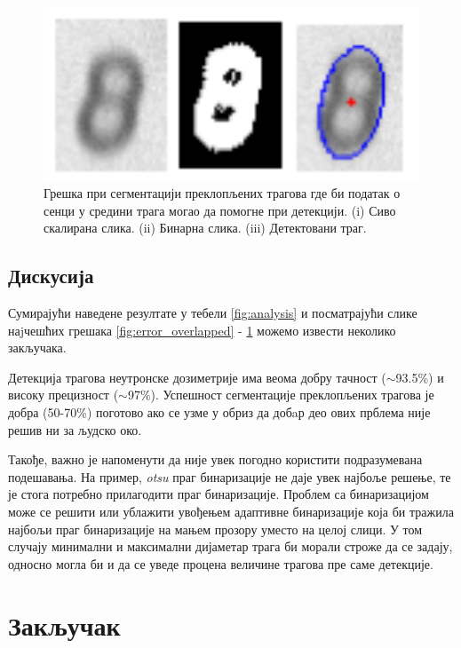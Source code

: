 \documentclass[12pt,a4paper,serbian,oneside]{book}
\begin{document}
\begin{figure}[H]
\begin{center}
\includegraphics[width=150mm]{images/shadow.png}
\end{center}
\caption{Грешка при сегментацији преклопљених трагова где би податак о сенци у средини трага могао да помогне при детекцији. (i) Сиво скалирана слика. (ii) Бинарна слика. (iii) Детектовани траг. }
\label{fig:shadow}
\end{figure}

\section{Дискусија}

Сумирајући наведене резултате у тебели \ref{fig:analysis} и посматрајући слике наjчешћих грешака  \ref{fig:error_overlapped} - \ref{fig:shadow} можемо извести неколико закључака.

Детекција трагова неутронске дозиметрије има веома добру тачност ($\sim$93.5\%) и  високу прецизност ($\sim$97\%). Успешност сегментације преклопљених трагова је добра (50-70\%) поготово ако се узме у обриз да добaр део ових прблема није решив ни за људско око.

Такође, важно је напоменути да није увек погодно користити подразумевана подешавања. На пример, \textit{otsu} праг бинаризације не даје увек најбоље решење, те је стога потребно прилагодити праг бинаризације. Проблем са бинаризацијом може се решити или ублажити увођењем адаптивне бинаризације која би тражила најбољи праг бинаризације на мањем прозору уместо на целој слици. У том случају минимални и максимални дијаметар трага би морали строже да се задају, односно могла би и да се уведе процена величине трагова пре саме детекције.

%
%
%

\chapter{Закључак}
\end{document}
